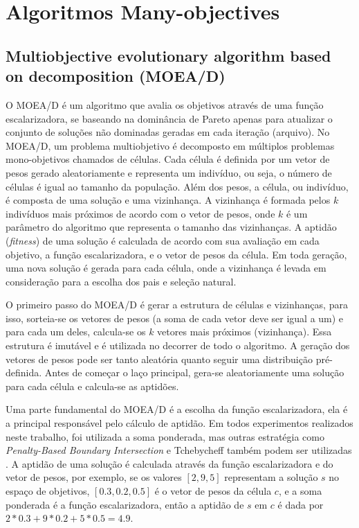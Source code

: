 \section{Algoritmos Many-objectives}

\subsection{Multiobjective evolutionary algorithm based on decomposition (MOEA/D)}
\label{section_moead}

O MOEA/D \cite{Zhang2007} é um algoritmo que avalia os objetivos através de uma função escalarizadora, se baseando na dominância de Pareto apenas para atualizar o conjunto de soluções não dominadas geradas em cada iteração (arquivo). No MOEA/D, um problema multiobjetivo é decomposto em múltiplos problemas mono-objetivos chamados de células. Cada célula é definida por um vetor de pesos gerado aleatoriamente e representa um indivíduo, ou seja, o número de células é igual ao tamanho da população. Além dos pesos, a célula, ou indivíduo, é composta de uma solução e uma vizinhança. A vizinhança é formada pelos $k$ indivíduos mais próximos de acordo com o vetor de pesos, onde $k$ é um parâmetro do algoritmo que representa o tamanho das vizinhanças. A aptidão (\textit{fitness}) de uma solução é calculada de acordo com sua avaliação em cada objetivo, a função escalarizadora, e o vetor de pesos da célula. Em toda geração, uma nova solução é gerada para cada célula, onde a vizinhança é levada em consideração para a escolha dos pais e seleção natural.

O primeiro passo do MOEA/D é gerar a estrutura de células e vizinhanças, para isso, sorteia-se os vetores de pesos (a soma de cada vetor deve ser igual a um) e para cada um deles, calcula-se os $k$ vetores mais próximos (vizinhança). Essa estrutura é imutável e é utilizada no decorrer de todo o algoritmo. A geração dos vetores de pesos pode ser tanto aleatória quanto seguir uma distribuição pré-definida. Antes de começar o laço principal, gera-se aleatoriamente uma solução para cada célula e calcula-se as aptidões. 

Uma parte fundamental do MOEA/D é a escolha da função escalarizadora, ela é a principal responsável pelo cálculo de aptidão. Em todos experimentos realizados neste trabalho, foi utilizada a soma ponderada, mas outras estratégia como \textit{Penalty-Based Boundary Intersection} e Tchebycheff também podem ser utilizadas \cite{Zhang2007}. A aptidão de uma solução é calculada através da função escalarizadora e do vetor de pesos, por exemplo, se os valores $[2, 9, 5]$ representam a solução $s$ no espaço de objetivos, $[0.3, 0.2, 0.5]$ é o vetor de pesos da célula $c$, e a soma ponderada é a função escalarizadora, então a aptidão de $s$ em $c$ é dada por $2 * 0.3 + 9 * 0.2 + 5 * 0.5 = 4.9$.

